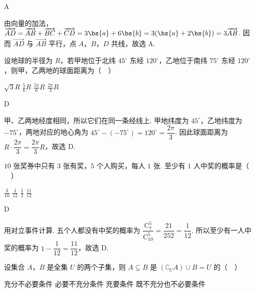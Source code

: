 \begin{answer}
A
\end{answer}

\begin{solution}
由向量的加法，
\(\overrightarrow{AD}=\overrightarrow{AB}+\overrightarrow{BC}+\overrightarrow{CD}=3\bs{a}+6\bs{b}=3(\bs{a}+2\bs{b})=3\overrightarrow{AB}\). 因而 \(\overrightarrow{AD}\) 与 \(\overrightarrow{AB}\) 平行，点 \(A\)，\(B\)，\(D\) 共线，故选 A.
\end{solution}

\begin{problem}
设地球的半径为 \(R\)，若甲地位于北纬 \( 45^{\circ} \) 东经 \( 120^{\circ} \)，乙地位于南纬 \( 75^{\circ} \) 东经 \( 120^{\circ} \)，则甲，乙两地的球面距离为（\(\quad\)）

\choices
    {\(\sqrt{3} R\)}
    {\(\frac{5}{6} R\)}
    {\(\frac{5\pi}{6} R\)}
    {\(\frac{2\pi}{3} R\)}
\end{problem}

\begin{answer}
D
\end{answer}

\begin{solution}
甲、乙两地经度相同，所以它们在同一条经线上. 甲地纬度为 \(45^{\circ}\)，乙地纬度为 \(-75^{\circ}\)，两地对应的地心角为 \(45^{\circ}-(-75^{\circ})=120^{\circ}=\dfrac{2\pi}{3}\). 因此球面距离为 \(R\cdot\dfrac{2\pi}{3}=\dfrac{2\pi}{3}R\)，故选 D.
\end{solution}

\begin{problem}
\(10\) 张奖券中只有 \(3\) 张有奖，\(5\) 个人购买，每人 \(1\) 张. 至少有 \(1\) 人中奖的概率是（\(\quad\)）

\choices
    {\(\frac{3}{10}\)}
    {\(\frac{1}{12}\)}
    {\(\frac{1}{2}\)}
    {\(\frac{11}{12}\)}
\end{problem}

\begin{answer}
D
\end{answer}

\begin{solution}
用对立事件计算. 五个人都没有中奖的概率为 \(\dfrac{\mathrm C_7^5}{\mathrm C_{10}^5}=\dfrac{21}{252}=\dfrac1{12}\). 所以至少有一人中奖的概率为 \(1-\dfrac1{12}=\dfrac{11}{12}\)，故选 D.
\end{solution}

\begin{problem}
设集合 \(A\)，\(B\) 是全集 \(U\) 的两个子集，则 \(A \subsetneq B\) 是 \((\complement_U A) \cup B = U\) 的（\(\quad\)）

\choices
    {充分不必要条件}
    {必要不充分条件}
    {充要条件}
    {既不充分也不必要条件}
\end{problem}

